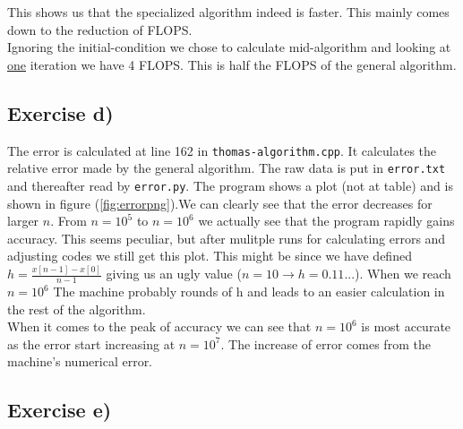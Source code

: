 \documentclass{article}
\begin{document}
  This shows us that the specialized algorithm indeed is faster. This mainly comes down to the reduction of FLOPS.\\
  Ignoring the initial-condition we chose to calculate mid-algorithm and looking at \underline{one} iteration we have 4 FLOPS. This is half the FLOPS of the general algorithm.

  \subsection{Exercise d)} \label{Results d)}

  The error is calculated at line 162 in \texttt{thomas-algorithm.cpp}. It calculates the relative error made by the general algorithm. The raw data is put in \texttt{error.txt} and thereafter read by \texttt{error.py}. The program shows a plot (not at table) and is shown in figure (\ref{fig:errorpng}).We can clearly see that the error decreases for larger $n$. From $n=10^5$ to $n=10^6$ we actually see that the program rapidly gains accuracy. This seems peculiar, but after mulitple runs for calculating errors and adjusting codes we still get this plot. This might be since we have defined $h=\frac{x[n-1]-x[0]}{n-1}$ giving us an ugly value ($n=10 \rightarrow{} h=0.11...$). When we reach $n=10^6$ The machine probably rounds of h and leads to an easier calculation in the rest of the algorithm.\\
  When it comes to the peak of accuracy we can see that $n=10^6$ is most accurate as the error start increasing at $n=10^7$. The increase of error comes from the machine's numerical error.

  \subsection{Exercise e)} \label{Results e)}
\end{document}
